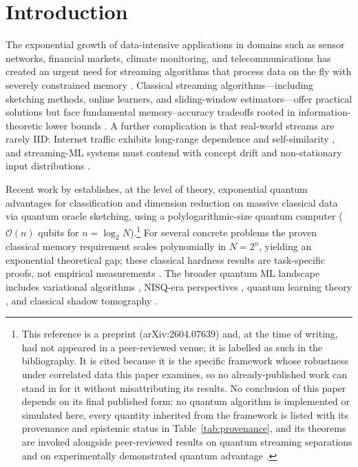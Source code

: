 \documentclass[sensors,article,submit,pdftex,moreauthors]{Definitions/mdpi}
\newcommand{\bigO}{\mathcal{O}}
\begin{document}
\section{Introduction}
\label{sec:intro}

The exponential growth of data-intensive applications in domains such as sensor networks, financial markets, climate monitoring, and telecommunications has created an urgent need for streaming algorithms that process data on the fly with severely constrained memory \citep{muthukrishnan2005data}. Classical streaming algorithms---including sketching methods, online learners, and sliding-window estimators---offer practical solutions but face fundamental memory--accuracy tradeoffs rooted in information-theoretic lower bounds \citep{alon1999space}. A further complication is that real-world streams are rarely IID: Internet traffic exhibits long-range dependence and self-similarity \citep{leland1994ethernet, willinger1997selfsimilarity}, and streaming-ML systems must contend with concept drift and non-stationary input distributions \citep{gama2014driftsurvey, arora2024driftreview, su2024elasticonline, yan2024bidynamic}.

Recent work by \citet{zhao2026exponential} establishes, at the level of theory, exponential quantum advantages for classification and dimension reduction on massive classical data via quantum oracle sketching, using a polylogarithmic-size quantum computer ($\bigO(n)$ qubits for $n = \log_2 N$).\footnote{This reference is a preprint (arXiv:2604.07639) and, at the time of writing, had not appeared in a peer-reviewed venue; it is labelled as such in the bibliography. It is cited because it is the specific framework whose robustness under correlated data this paper examines, so no already-published work can stand in for it without misattributing its results. No conclusion of this paper depends on its final published form: no quantum algorithm is implemented or simulated here, every quantity inherited from the framework is listed with its provenance and epistemic status in Table~\ref{tab:provenance}, and its theorems are invoked alongside peer-reviewed results on quantum streaming separations \citep{kallaugher2021streaming, kallaugher2024maxdicut, kallaugher2025designquantum} and on experimentally demonstrated quantum advantage \citep{huang2022experiments}.} For several concrete problems the proven classical memory requirement scales polynomially in $N = 2^n$, yielding an exponential theoretical gap; these classical hardness results are task-specific proofs, not empirical measurements \citep{harrow2009hhl, havlicek2019qkernels, schuld2021encoding, biamonte2017qml}. The broader quantum ML landscape includes variational algorithms \citep{cerezo2021variational}, NISQ-era perspectives \citep{preskill2018nisq}, quantum learning theory \citep{schuld2018supervised}, and classical shadow tomography \citep{huang2020shadows}.
\end{document}

